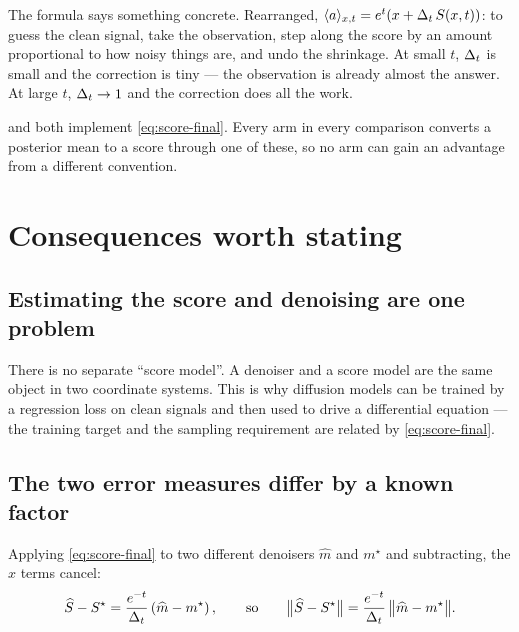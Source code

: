 \begin{intuition}
The formula says something concrete. Rearranged,
$\langle a \rangle_{x,t} = e^{t}\!\left(x + \Delta_t\,S(x,t)\right)$: to guess the clean signal, take the
observation, step along the score by an amount proportional to how noisy things are, and undo
the shrinkage. At small $t$, $\Delta_t$ is small and the correction is tiny --- the observation is
already almost the answer. At large $t$, $\Delta_t\to1$ and the correction does all the work.
\end{intuition}

\begin{codebox}
 and
 both implement \eqref{eq:score-final}. Every arm
in every comparison converts a posterior mean to a score through one of these, so no arm can
gain an advantage from a different convention.
\end{codebox}

\section{Consequences worth stating}

\subsection{Estimating the score and denoising are one problem}

There is no separate ``score model''. A denoiser and a score model are the same object in two
coordinate systems. This is why diffusion models can be trained by a regression loss on clean
signals and then used to drive a differential equation --- the training target and the
sampling requirement are related by \eqref{eq:score-final}.

\subsection{The two error measures differ by a known factor}
\label{sec:reweighting}

Applying \eqref{eq:score-final} to two different denoisers $\widehat{m}$ and $m^\star$ and
subtracting, the $x$ terms cancel:
\begin{equation}
\label{eq:reweight}
\widehat{S} - S^\star
= \frac{e^{-t}}{\Delta_t}\left(\widehat{m} - m^\star\right),
\qquad\text{so}\qquad
\big\|\widehat{S} - S^\star\big\|
= \frac{e^{-t}}{\Delta_t}\,\big\|\widehat{m} - m^\star\big\| .
\end{equation}

